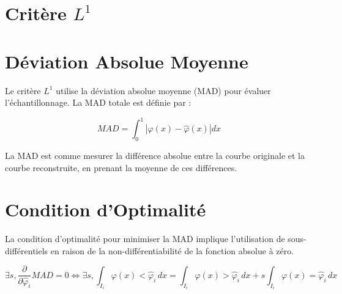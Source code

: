 \documentclass[12pt]{article}
\begin{document}
\newpage

\section{Critère \(L^1\)}

\sub\section{Déviation Absolue Moyenne}

Le critère \(L^1\) utilise la déviation absolue moyenne (MAD) pour évaluer l'échantillonnage. La MAD totale est définie par :

\begin{equation}
MAD = \int_0^1 |\varphi(x) - \hat{\varphi}(x)| dx
\end{equation}

\begin{tcolorbox}[title={Intuition}]
La MAD est comme mesurer la différence absolue entre la courbe originale et la courbe reconstruite, en prenant la moyenne de ces différences.
\end{tcolorbox}


\sub\section{Condition d'Optimalité}

La condition d'optimalité pour minimiser la MAD implique l'utilisation de sous-différentiels en raison de la non-différentiabilité de la fonction absolue à zéro.

\begin{equation}
\exists s, \frac{\partial}{\partial \hat{\varphi}_i} MAD = 0 \iff \exists s, \int_{I_i} \varphi(x) < \hat{\varphi}_i \, dx = \int_{I_i} \varphi(x) > \hat{\varphi}_i \, dx + s \int_{I_i} \varphi(x) = \hat{\varphi}_i \, dx
\end{equation}

\end{document}
